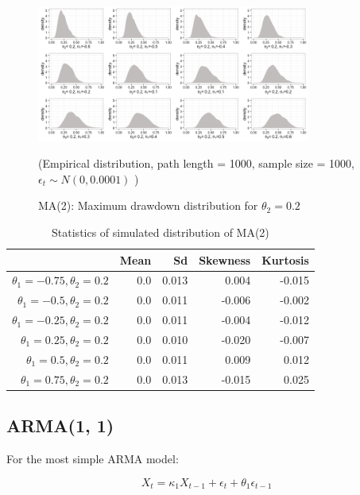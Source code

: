 \documentclass[11pt]{article}
\begin{document}
\begin{figure}[H]
\centering
\includegraphics[width = 0.8\textwidth]{../figures/simulation/MA2_maxDrawdown_dist_theta2_02}
\caption{MA(2): Maximum drawdown distribution for $\theta_2 = 0.2$}
(Empirical distribution, path length = 1000, sample size = 1000, $\epsilon_t \sim N(0, 0.0001)$ )
\label{fig:MA2_maxDrawdown_dist_theta2_02}
\end{figure}

\begin{table}[H]
\centering
\begin{tabular}{|r |r r r r|}
\hline
& Mean & Sd & Skewness & Kurtosis \\
\hline
$\theta_1 = -0.75, \theta_2 = 0.2$ & 0.0 & 0.013 & 0.004 & -0.015\\
$\theta_1 = -0.5, \theta_2 = 0.2$ & 0.0 & 0.011 & -0.006 & -0.002\\
$\theta_1 = -0.25, \theta_2 = 0.2$ & 0.0 &  0.011 & -0.004 & -0.012\\
$\theta_1 = 0.25, \theta_2 = 0.2$ & 0.0 &  0.010 & -0.020 & -0.007\\
$\theta_1 = 0.5, \theta_2 = 0.2$ & 0.0 & 0.011 & 0.009 & 0.012\\
$\theta_1 = 0.75, \theta_2 = 0.2$ & 0.0 & 0.013 & -0.015 & 0.025\\
\hline
\end{tabular}
\caption{Statistics of simulated distribution of MA(2)}
\label{table: MA2_return}
\end{table}

\subsection{ARMA(1, 1)} %

For the most simple ARMA model:

\begin{equation}
X_t = \kappa_1X_{t-1} + \epsilon_t + \theta_1\epsilon_{t-1}
\end{equation}
\end{document}
